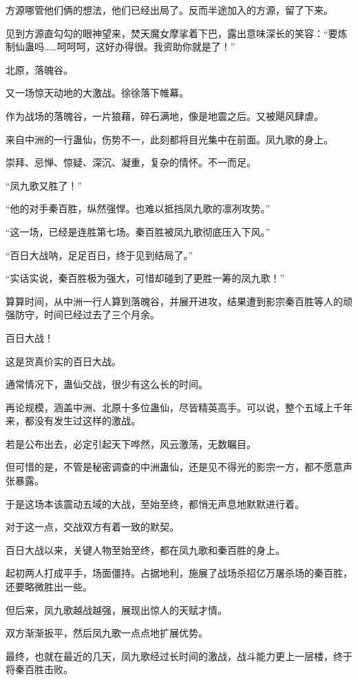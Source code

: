 \begin{this_body}
方源哪管他们俩的想法，他们已经出局了。反而半途加入的方源，留了下来。

见到方源直勾勾的眼神望来，焚天魔女摩挲着下巴，露出意味深长的笑容：“要炼制仙蛊吗……呵呵呵，这好办得很。我资助你就是了！”

北原，落魄谷。

又一场惊天动地的大激战。徐徐落下帷幕。

作为战场的落魄谷，一片狼藉，碎石满地，像是地震之后。又被飓风肆虐。

来自中洲的一行蛊仙，伤势不一，此刻都将目光集中在前面。凤九歌的身上。

崇拜、忌惮、惊疑、深沉、凝重，复杂的情怀。不一而足。

“凤九歌又胜了！”

“他的对手秦百胜，纵然强悍。也难以抵挡凤九歌的凛冽攻势。”

“这一场，已经是连胜第七场。秦百胜被凤九歌彻底压入下风。”

“百日大战呐，足足百日，终于见到结局了。”

“实话实说，秦百胜极为强大，可惜却碰到了更胜一筹的凤九歌！”

算算时间，从中洲一行人算到落魄谷，并展开进攻，结果遭到影宗秦百胜等人的顽强防守，时间已经过去了三个月余。

百日大战！

这是货真价实的百日大战。

通常情况下，蛊仙交战，很少有这么长的时间。

再论规模，涵盖中洲、北原十多位蛊仙，尽皆精英高手。可以说，整个五域上千年来，都没有发生过这样的激战。

若是公布出去，必定引起天下哗然，风云激荡，无数瞩目。

但可惜的是，不管是秘密调查的中洲蛊仙，还是见不得光的影宗一方，都不愿意声张暴露。

于是这场本该震动五域的大战，至始至终，都悄无声息地默默进行着。

对于这一点，交战双方有着一致的默契。

百日大战以来，关键人物至始至终，都在凤九歌和秦百胜的身上。

起初两人打成平手，场面僵持。占据地利，施展了战场杀招亿万屠杀场的秦百胜，还要略微胜出一些。

但后来，凤九歌越战越强，展现出惊人的天赋才情。

双方渐渐扳平，然后凤九歌一点点地扩展优势。

最终，也就在最近的几天，凤九歌经过长时间的激战，战斗能力更上一层楼，终于将秦百胜击败。


\end{this_body}
